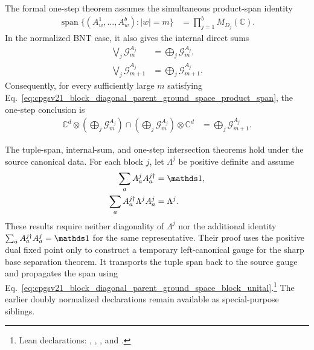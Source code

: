 \documentclass{article}
\begin{document}
The formal one-step theorem assumes the simultaneous product-span identity
\begin{align}
  \operatorname{span}
  \{(A^1_w,\ldots,A^b_w):|w|=m\}
    &=
    \prod_{j=1}^bM_{D_j}(\mathbb C).
  \label{eq:cpgsv21_block_diagonal_parent_ground_space_product_span}
\end{align}
In the normalized BNT case, it also gives the internal direct sums
\begin{align}
  \bigvee_j\mathcal G_m^{A_j}
    &=
    \bigoplus_j\mathcal G_m^{A_j},
  \label{eq:cpgsv21_block_diagonal_parent_ground_space_internal_sum_m}\\
  \bigvee_j\mathcal G_{m+1}^{A_j}
    &=
    \bigoplus_j\mathcal G_{m+1}^{A_j}.
  \label{eq:cpgsv21_block_diagonal_parent_ground_space_internal_sum_succ}
\end{align}
Consequently, for every sufficiently large $m$ satisfying
Eq.~\ref{eq:cpgsv21_block_diagonal_parent_ground_space_product_span}, the
one-step conclusion is
\begin{align}
  \mathbb C^d\otimes
  \left(\bigoplus_j\mathcal G_m^{A_j}\right)
  \cap
  \left(\bigoplus_j\mathcal G_m^{A_j}\right)\otimes\mathbb C^d
    &=
    \bigoplus_j\mathcal G_{m+1}^{A_j}.
  \label{eq:cpgsv21_block_diagonal_parent_ground_space_formal_intersection}
\end{align}

The tuple-span, internal-sum, and one-step intersection theorems hold under the
source canonical data. For each block $j$, let $\Lambda^j$ be positive
definite and assume
\begin{align}
  \sum_aA^j_aA^{j\dagger}_a
    &=
    \Id,
  \label{eq:cpgsv21_block_diagonal_parent_ground_space_block_unital}\\
  \sum_aA^{j\dagger}_a\Lambda^jA^j_a
    &=
    \Lambda^j.
  \label{eq:cpgsv21_block_diagonal_parent_ground_space_block_dual_fixed}
\end{align}
These results require neither diagonality of $\Lambda^j$ nor the additional
identity $\sum_aA^{j\dagger}_aA^j_a=\Id$ for the same representative. Their
proof uses the positive dual fixed point only to construct a temporary
left-canonical gauge for the sharp base separation theorem. It transports the
tuple span back to the source gauge and propagates the span using
Eq.~\ref{eq:cpgsv21_block_diagonal_parent_ground_space_block_unital}.\footnote{Lean
declarations:
,
,
,
and
.}
The earlier doubly normalized declarations remain available as
special-purpose siblings.
\end{document}
